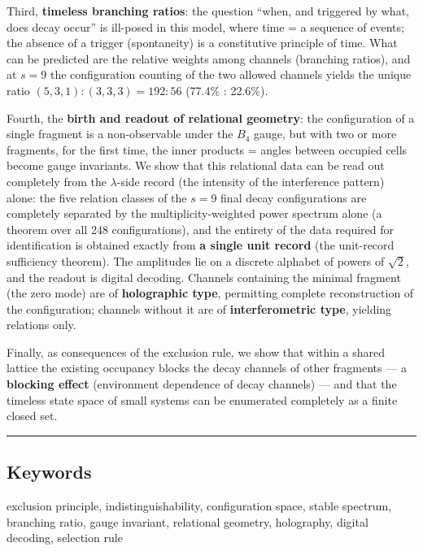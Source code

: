 \documentclass[
]{article}
\begin{document}
Third, \textbf{timeless branching ratios}: the question ``when, and
triggered by what, does decay occur'' is ill-posed in this model, where
time = a sequence of events; the absence of a trigger (spontaneity) is a
constitutive principle of time. What can be predicted are the relative
weights among channels (branching ratios), and at \(s=9\) the
configuration counting of the two allowed channels yields the unique
ratio \((5,3,1):(3,3,3)=192:56\) (77.4\% : 22.6\%).

Fourth, the \textbf{birth and readout of relational geometry}: the
configuration of a single fragment is a non-observable under the \(B_4\)
gauge, but with two or more fragments, for the first time, the inner
products = angles between occupied cells become gauge invariants. We
show that this relational data can be read out completely from the
\(\lambda\)-side record (the intensity of the interference pattern)
alone: the five relation classes of the \(s=9\) final decay
configurations are completely separated by the multiplicity-weighted
power spectrum alone (a theorem over all 248 configurations), and the
entirety of the data required for identification is obtained exactly
from \textbf{a single unit record} (the unit-record sufficiency
theorem). The amplitudes lie on a discrete alphabet of powers of
\(\sqrt2\), and the readout is digital decoding. Channels containing the
minimal fragment (the zero mode) are of \textbf{holographic type},
permitting complete reconstruction of the configuration; channels
without it are of \textbf{interferometric type}, yielding relations
only.

Finally, as consequences of the exclusion rule, we show that within a
shared lattice the existing occupancy blocks the decay channels of other
fragments --- a \textbf{blocking effect} (environment dependence of
decay channels) --- and that the timeless state space of small systems
can be enumerated completely as a finite closed set.

\begin{center}\rule{0.5\linewidth}{0.5pt}\end{center}

\subsection{Keywords}\label{keywords}

exclusion principle, indistinguishability, configuration space, stable
spectrum, branching ratio, gauge invariant, relational geometry,
holography, digital decoding, selection rule
\end{document}
